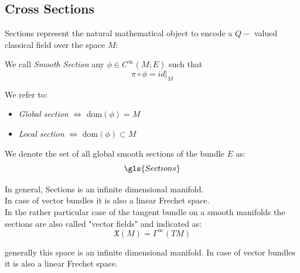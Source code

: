 \documentclass[Main]{subfiles}
\begin{document}
		\subsection{Cross Sections}
			Sections represent the natural mathematical object to encode a $Q-$ valued classical field over the space $M$:			
			\begin{definition}
				We call \emph{Smooth Section} 	any $\phi\in C^\infty(M;E)$ such that $$\pi\circ\phi = id|_M$$		
			\end{definition}
				We refer to:
					\begin{itemize}
						\item \emph{Global section} $\Leftrightarrow$ $\textrm{dom}(\phi) = M$
						\item \emph{Local section} $\Leftrightarrow$ $\textrm{dom}(\phi) \subset M$
					\end{itemize}
				We denote the set of all global smooth sections of the bundle $E$  as:
				\begin{displaymath}
					\gls{Sections}
				\end{displaymath}
\ifToninus
		\begin{observation}
			In general, \gls{Sections} is an infinite dimensional manifold. 
			\\
				In case of vector bundles it is also a linear Frechet space\cite{Kriegl}.
			\\
			In the rather particular case of the tangent bundle on a smooth manifolds the sections are also called "vector fields" and indicated as:
			\begin{displaymath}
				\mathfrak{X}(M) = \Gamma^\infty(TM)
			\end{displaymath}
		\end{observation}
\else
			generally this space is an infinite dimensional manifold.
			In case of vector bundles it is also a linear Frechet space\cite{Kriegl}.
\fi
\end{document}

